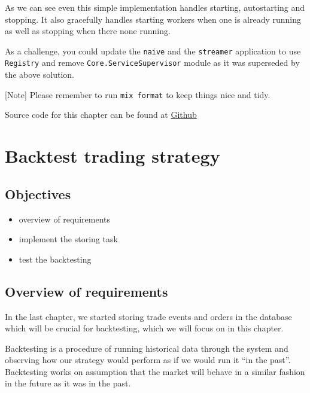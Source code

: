 \documentclass[
  oneside]{book}
\providecommand{\tightlist}{%
  \setlength{\itemsep}{0pt}\setlength{\parskip}{0pt}}
\begin{document}
As we can see even this simple implementation handles starting, autostarting and stopping. It also gracefully handles starting workers when one is already running as well as stopping when there none running.

As a challenge, you could update the \texttt{naive} and the \texttt{streamer} application to use \texttt{Registry} and remove \texttt{Core.ServiceSupervisor} module as it was superseded by the above solution.

{[}Note{]} Please remember to run \texttt{mix\ format} to keep things nice and tidy.

Source code for this chapter can be found at \href{https://github.com/frathon/create-a-cryptocurrency-trading-bot-in-elixir-source-code/tree/chapter_14}{Github}

\hypertarget{backtest-trading-strategy}{%
\chapter{Backtest trading strategy}\label{backtest-trading-strategy}}

\hypertarget{objectives-14}{%
\section{Objectives}\label{objectives-14}}

\begin{itemize}
\tightlist
\item
  overview of requirements
\item
  implement the storing task
\item
  test the backtesting
\end{itemize}

\hypertarget{overview-of-requirements-2}{%
\section{Overview of requirements}\label{overview-of-requirements-2}}

In the last chapter, we started storing trade events and orders in the database which will be crucial for backtesting, which we will focus on in this chapter.

Backtesting is a procedure of running historical data through the system and observing how our strategy would perform as if we would run it ``in the past''. Backtesting works on assumption that the market will behave in a similar fashion in the future as it was in the past.
\end{document}
